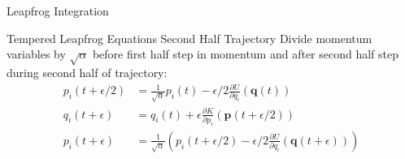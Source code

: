 \documentclass{beamer}
\begin{document}
\begin{frame}{Leapfrog Integration}
    {
        \begin{block}{Tempered Leapfrog Equations Second Half Trajectory}
        Divide momentum variables by $\sqrt{\alpha}$ before first half step in momentum and after second half step during second half of trajectory:
            \begin{align*}
                p_i\left(t+\epsilon/2\right) & = \frac{1}{\sqrt{\alpha}}p_i\left(t\right) - \epsilon/2\frac{\partial U}{\partial q_i}\left(\bm{q}\left(t\right)\right) \\
                q_i\left(t+\epsilon\right) & = q_i\left(t\right) + \epsilon\frac{\partial K}{\partial p_i}\left(\bm{p}\left(t+\epsilon/2\right)\right) \\
                p_i\left(t+\epsilon\right) & = \frac{1}{\sqrt{\alpha}}\left(p_i\left(t+\epsilon/2\right) - \epsilon/2\frac{\partial U}{\partial q_i}\left(\bm{q}\left(t+\epsilon\right)\right)\right)
            \end{align*}
        \end{block}
    }
\end{frame}
\end{document}
